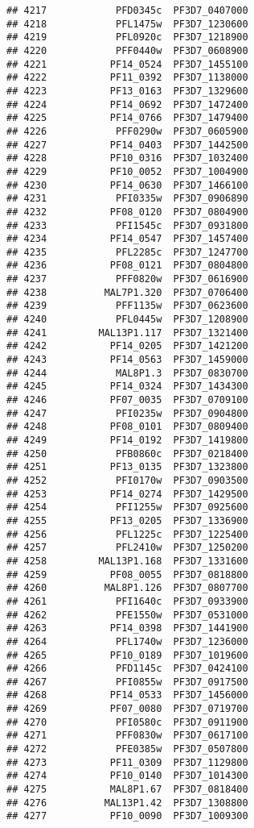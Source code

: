 \documentclass{article}\usepackage[]{graphicx}\usepackage[]{color}
\makeatletter
\newenvironment{kframe}{%
 \def\at@end@of@kframe{}%
 \ifinner\ifhmode%
  \def\at@end@of@kframe{\end{minipage}}%
  \begin{minipage}{\columnwidth}%
 \fi\fi%
 \def\FrameCommand##1{\hskip\@totalleftmargin \hskip-\fboxsep
 \colorbox{shadecolor}{##1}\hskip-\fboxsep
     \hskip-\linewidth \hskip-\@totalleftmargin \hskip\columnwidth}%
 \MakeFramed {\advance\hsize-\width
   \@totalleftmargin\z@ \linewidth\hsize
   \@setminipage}}%
 {\par\unskip\endMakeFramed%
 \at@end@of@kframe}
\newenvironment{knitrout}{}{} %
\makeatother
\begin{document}
\begin{knitrout}
\begin{kframe}
\begin{verbatim}
## 4217            PFD0345c  PF3D7_0407000
## 4218            PFL1475w  PF3D7_1230600
## 4219            PFL0920c  PF3D7_1218900
## 4220            PFF0440w  PF3D7_0608900
## 4221           PF14_0524  PF3D7_1455100
## 4222           PF11_0392  PF3D7_1138000
## 4223           PF13_0163  PF3D7_1329600
## 4224           PF14_0692  PF3D7_1472400
## 4225           PF14_0766  PF3D7_1479400
## 4226            PFF0290w  PF3D7_0605900
## 4227           PF14_0403  PF3D7_1442500
## 4228           PF10_0316  PF3D7_1032400
## 4229           PF10_0052  PF3D7_1004900
## 4230           PF14_0630  PF3D7_1466100
## 4231            PFI0335w  PF3D7_0906890
## 4232           PF08_0120  PF3D7_0804900
## 4233            PFI1545c  PF3D7_0931800
## 4234           PF14_0547  PF3D7_1457400
## 4235            PFL2285c  PF3D7_1247700
## 4236           PF08_0121  PF3D7_0804800
## 4237            PFF0820w  PF3D7_0616900
## 4238          MAL7P1.320  PF3D7_0706400
## 4239            PFF1135w  PF3D7_0623600
## 4240            PFL0445w  PF3D7_1208900
## 4241         MAL13P1.117  PF3D7_1321400
## 4242           PF14_0205  PF3D7_1421200
## 4243           PF14_0563  PF3D7_1459000
## 4244            MAL8P1.3  PF3D7_0830700
## 4245           PF14_0324  PF3D7_1434300
## 4246           PF07_0035  PF3D7_0709100
## 4247            PFI0235w  PF3D7_0904800
## 4248           PF08_0101  PF3D7_0809400
## 4249           PF14_0192  PF3D7_1419800
## 4250            PFB0860c  PF3D7_0218400
## 4251           PF13_0135  PF3D7_1323800
## 4252            PFI0170w  PF3D7_0903500
## 4253           PF14_0274  PF3D7_1429500
## 4254            PFI1255w  PF3D7_0925600
## 4255           PF13_0205  PF3D7_1336900
## 4256            PFL1225c  PF3D7_1225400
## 4257            PFL2410w  PF3D7_1250200
## 4258         MAL13P1.168  PF3D7_1331600
## 4259           PF08_0055  PF3D7_0818800
## 4260          MAL8P1.126  PF3D7_0807700
## 4261            PFI1640c  PF3D7_0933900
## 4262            PFE1550w  PF3D7_0531000
## 4263           PF14_0398  PF3D7_1441900
## 4264            PFL1740w  PF3D7_1236000
## 4265           PF10_0189  PF3D7_1019600
## 4266            PFD1145c  PF3D7_0424100
## 4267            PFI0855w  PF3D7_0917500
## 4268           PF14_0533  PF3D7_1456000
## 4269           PF07_0080  PF3D7_0719700
## 4270            PFI0580c  PF3D7_0911900
## 4271            PFF0830w  PF3D7_0617100
## 4272            PFE0385w  PF3D7_0507800
## 4273           PF11_0309  PF3D7_1129800
## 4274           PF10_0140  PF3D7_1014300
## 4275           MAL8P1.67  PF3D7_0818400
## 4276          MAL13P1.42  PF3D7_1308800
## 4277           PF10_0090  PF3D7_1009300

\end{verbatim}
\end{kframe}
\end{knitrout}
\end{document}

